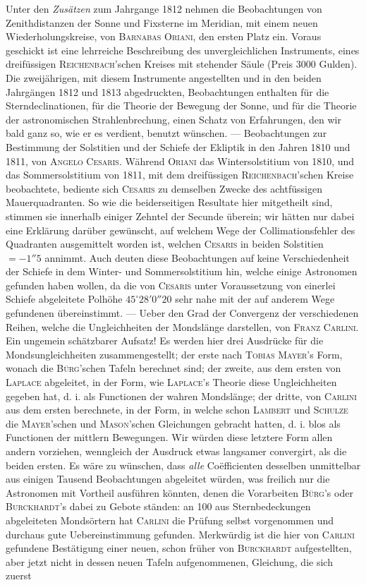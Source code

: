 Unter den \emph{Zusätzen} zum Jahrgange 1812 nehmen die Beobachtungen von Zenithdistanzen der Sonne und Fixsterne im Meridian, mit einem neuen Wiederholungskreise, von \textsc{Barnabas Oriani}, den ersten Platz ein. Voraus geschickt ist eine lehrreiche Beschreibung des unvergleichlichen Instruments, eines dreifüssigen \textsc{Reichenbach}'schen Kreises mit stehender Säule (Preis 3000 Gulden). Die zweijährigen, mit diesem Instrumente angestellten und in den beiden Jahrgängen 1812 und 1813 abgedruckten, Beobachtungen enthalten für die Sterndeclinationen, für die Theorie der Bewegung der Sonne, und für die Theorie der astronomischen Strahlenbrechung, einen Schatz von Erfahrungen, den wir bald ganz so, wie er es verdient, benutzt wünschen. --- Beobachtungen zur Bestimmung der Solstitien und der Schiefe der Ekliptik in den Jahren 1810 und 1811, von \textsc{Angelo Cesaris}. Während \textsc{Oriani} das Wintersolstitium von 1810, und das Sommersolstitium von 1811, mit dem dreifüssigen \textsc{Reichenbach}'schen Kreise beobachtete, bediente sich \textsc{Cesaris} zu demselben Zwecke des achtfüssigen Mauerquadranten. So wie die beiderseitigen Resultate hier mitgetheilt sind, stimmen sie innerhalb einiger Zehntel der Secunde überein; wir hätten nur dabei eine Erklärung darüber gewünscht, auf welchem Wege der Collimationsfehler des Quadranten ausgemittelt worden ist, welchen \textsc{Cesaris} in beiden Solstitien $= -1''5$ annimmt. Auch deuten diese Beobachtungen auf keine Verschiedenheit der Schiefe in dem Winter- und Sommersolstitium hin, welche einige Astronomen gefunden haben wollen, da die von \textsc{Cesaris} unter Voraussetzung von einerlei Schiefe abgeleitete Polhöhe $45^\circ 28' 0''20$ sehr nahe mit der auf anderem Wege gefundenen übereinstimmt. --- Ueber den Grad der Convergenz der verschiedenen Reihen, welche die Ungleichheiten der Mondslänge darstellen, von \textsc{Franz Carlini}. Ein ungemein schätzbarer Aufsatz! Es werden hier drei Ausdrücke für die Mondsungleichheiten zusammengestellt; der erste nach \textsc{Tobias Mayer}'s Form, wonach die \textsc{Bürg}'schen Tafeln berechnet sind; der zweite, aus dem ersten von \textsc{Laplace} abgeleitet, in der Form, wie \textsc{Laplace}'s Theorie diese Ungleichheiten gegeben hat, d. i. als Functionen der wahren Mondslänge; der dritte, von \textsc{Carlini} aus dem ersten berechnete, in der Form, in welche schon \textsc{Lambert} und \textsc{Schulze} die \textsc{Mayer}'schen und \textsc{Mason}'schen Gleichungen gebracht hatten, d. i. blos als Functionen der mittlern Bewegungen. Wir würden diese letztere Form allen andern vorziehen, wenngleich der Ausdruck etwas langsamer convergirt, als die beiden ersten. Es wäre zu wünschen, dass \emph{alle} Coëfficienten desselben unmittelbar aus einigen Tausend Beobachtungen abgeleitet würden, was freilich nur die Astronomen mit Vortheil ausführen könnten, denen die Vorarbeiten \textsc{Bürg}'s oder \textsc{Burckhardt}'s dabei zu Gebote ständen: an 100 aus Sternbedeckungen abgeleiteten Mondsörtern hat \textsc{Carlini} die Prüfung selbst vorgenommen und durchaus gute Uebereinstimmung gefunden. Merkwürdig ist die hier von \textsc{Carlini} gefundene Bestätigung einer neuen, schon früher von \textsc{Burckhardt} aufgestellten, aber jetzt nicht in dessen neuen Tafeln aufgenommenen, Gleichung, die sich zuerst 